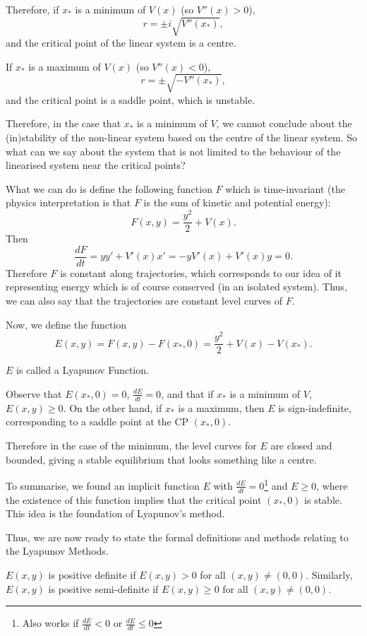 Therefore, if $x_*$ is a minimum of $V(x)$ (so $V''(x)>0$),
\[
r = \pm i\sqrt{V''(x_*)},
\]
and the critical point of the linear system is a centre.

If $x_*$ is a maximum of $V(x)$ (so $V''(x)<0$),
\[
r = \pm \sqrt{-V''(x_*)},
\]
and the critical point is a saddle point, which is unstable.

Therefore, in the case that $x_*$ is a minimum of $V$, we cannot conclude about the (in)stability of the non-linear system based on the centre of the linear system. So what can we say about the system that is not limited to the behaviour of the linearised system near the critical points?

What we can do is define the following function $F$ which is time-invariant (the physics interpretation is that $F$ is the sum of kinetic and potential energy):
\[
F(x,y) = \frac{y^2}{2} + V(x).
\]
Then
\[
\frac{dF}{dt} = yy' + V'(x)x' = -yV'(x) + V'(x)y = 0.
\]
Therefore $F$ is constant along trajectories, which corresponds to our idea of it representing energy which is of course conserved (in an isolated system). Thus, we can also say that the trajectories are constant level curves of $F$.

Now, we define the function
\[
E(x,y) = F(x,y) - F(x_*,0) = \frac{y^2}{2} + V(x) - V(x_*).
\]

\begin{remark}
	$E$ is called a Lyapunov Function.
\end{remark}

Observe that $E(x_*, 0)=0$, $\frac{dE}{dt} = 0$, and that if $x_*$ is a minimum of $V$, $E(x,y) \geq 0$. On the other hand, if $x_*$ is a maximum, then $E$ is sign-indefinite, corresponding to a saddle point at the CP $(x_*,0)$.

Therefore in the case of the minimum, the level curves for $E$ are closed and bounded, giving a stable equilibrium that looks something like a centre.

To summarise, we found an implicit function $E$ with $\frac{dE}{dt} = 0$\footnote{Also works if $\frac{dE}{dt}<0$ or $\frac{dE}{dt}\leq0$} and $E \geq 0$, where the existence of this function implies that the critical point $(x_*,0)$ is stable. This idea is the foundation of Lyapunov's method.

Thus, we are now ready to state the formal definitions and methods relating to the Lyapunov Methods.

\begin{definition}
	$E(x,y)$ is positive definite if $E(x,y)>0$ for all $(x,y) \neq (0,0)$. Similarly, $E(x,y)$ is positive semi-definite if $E(x,y)\geq 0$ for all $(x,y) \neq (0,0)$.
\end{definition}

